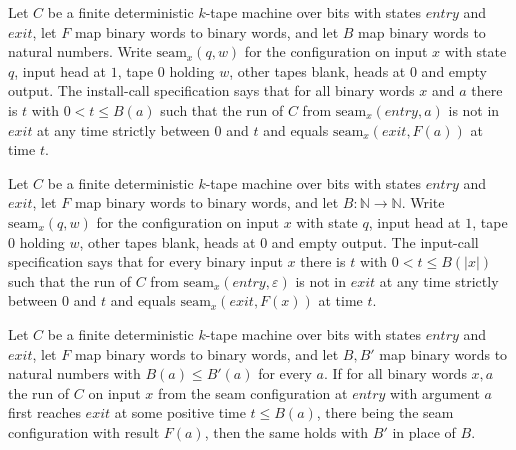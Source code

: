 \begin{definition}
\label{Turing.NTimeDiag.QySpec}
\leanok
{}
Let $C$ be a finite deterministic $k$-tape machine over bits with states $\mathit{entry}$ and
$\mathit{exit}$, let $F$ map binary words to binary words, and let $B$ map binary words to
natural numbers. Write $\mathrm{seam}_x(q, w)$ for the configuration on input $x$ with state $q$,
input head at $1$, tape $0$ holding $w$, other tapes blank, heads at $0$ and empty output. The
install-call specification says that for all binary words $x$ and $a$ there is $t$ with
$0 < t \le B(a)$ such that the run of $C$ from $\mathrm{seam}_x(\mathit{entry}, a)$ is not in
$\mathit{exit}$ at any time strictly between $0$ and $t$ and equals
$\mathrm{seam}_x(\mathit{exit}, F(a))$ at time $t$.
\end{definition}

\begin{definition}
\label{Turing.NTimeDiag.QyInSpec}
\leanok
{}
Let $C$ be a finite deterministic $k$-tape machine over bits with states $\mathit{entry}$ and
$\mathit{exit}$, let $F$ map binary words to binary words, and let
$B : \mathbb{N} \to \mathbb{N}$. Write $\mathrm{seam}_x(q, w)$ for the configuration on input $x$
with state $q$, input head at $1$, tape $0$ holding $w$, other tapes blank, heads at $0$ and empty
output. The input-call specification says that for every binary input $x$ there is $t$ with
$0 < t \le B(|x|)$ such that the run of $C$ from $\mathrm{seam}_x(\mathit{entry}, \varepsilon)$
is not in $\mathit{exit}$ at any time strictly between $0$ and $t$ and equals
$\mathrm{seam}_x(\mathit{exit}, F(x))$ at time $t$.
\end{definition}

\begin{theorem}
\label{Turing.NTimeDiag.QySpec.mono}
\leanok
{}
Let $C$ be a finite deterministic $k$-tape machine over bits with states $\mathit{entry}$ and
$\mathit{exit}$, let $F$ map binary words to binary words, and let $B, B'$ map binary words to
natural numbers with $B(a) \le B'(a)$ for every $a$. If for all binary words $x, a$ the run of $C$
on input $x$ from the seam configuration at $\mathit{entry}$ with argument $a$ first reaches
$\mathit{exit}$ at some positive time $t \le B(a)$, there being the seam configuration with result
$F(a)$, then the same holds with $B'$ in place of $B$.
\end{theorem}

